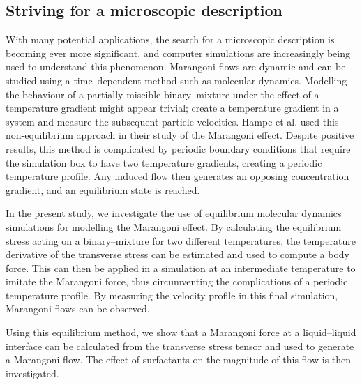 \subsection{Striving for a microscopic description}
With many potential applications, the search for a microscopic description is becoming ever more significant, and computer simulations are increasingly being used to understand this phenomenon.
Marangoni flows are dynamic and can be studied using a time--dependent method such as molecular dynamics.
Modelling the behaviour of a partially miscible binary--mixture under the effect of a temperature gradient might appear trivial; create a temperature gradient in a system and measure the subsequent particle velocities.
Hampe et al. used this non-equilibrium approach in their study of the Marangoni effect.\cite{HolgerBoppHampe}
Despite positive results, this method is complicated by periodic boundary conditions that require the simulation box to have two temperature gradients, creating a periodic temperature profile.
Any induced flow then generates an opposing concentration gradient, and an equilibrium state is reached.

In the present study, we investigate the use of equilibrium molecular dynamics simulations for modelling the Marangoni effect.
By calculating the equilibrium stress acting on a binary--mixture for two different temperatures, the temperature derivative of the transverse stress can be estimated and used to compute a body force.
This can then be applied in a simulation at an intermediate temperature to imitate the Marangoni force, thus circumventing the complications of a periodic temperature profile.
By measuring the velocity profile in this final simulation, Marangoni flows can be observed.

Using this equilibrium method, we show that a Marangoni force at a liquid--liquid interface can be calculated from the transverse stress tensor and used to generate a Marangoni flow.
The effect of surfactants on the magnitude of this flow is then investigated.

